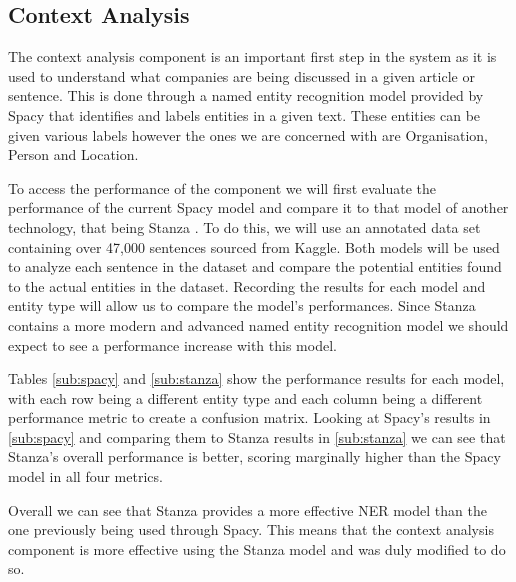         \subsection{Context Analysis}
        \label{eval:context}
        The context analysis component is an important first step in the system as it is used to understand what companies are being discussed in a given article or sentence. This is done through a named entity recognition model provided by Spacy \citep{technology:Spacy} that identifies and labels entities in a given text. These entities can be given various labels however the ones we are concerned with are Organisation, Person and Location. 
        
        To access the performance of the component we will first evaluate the performance of the current Spacy model and compare it to that model of another technology, that being Stanza \citep{technology:Stanza}. %
        To do this, we will use an annotated data set containing over 47,000 sentences sourced from Kaggle. Both models will be used to analyze each sentence in the dataset and compare the potential entities found to the actual entities in the dataset. Recording the results for each model and entity type will allow us to compare the model's performances.
        Since Stanza contains a more modern and advanced named entity recognition model we should expect to see a performance increase with this model.
        
        Tables \ref{sub:spacy} and \ref{sub:stanza} show the performance results for each model, with each row being a different entity type and each column being a different performance metric to create a confusion matrix. 
        Looking at Spacy's results in \ref{sub:spacy} and comparing them to Stanza results in \ref{sub:stanza} we can see that Stanza's overall performance is better, scoring marginally higher than the Spacy model in all four metrics.
        
        Overall we can see that Stanza provides a more effective NER model than the one previously being used through Spacy. This means that the context analysis component is more effective using the Stanza model and was duly modified to do so.
        
